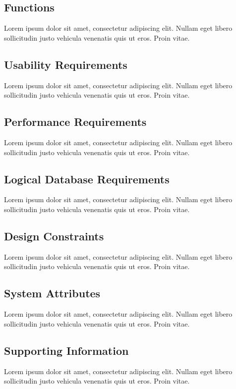 \documentclass[a4paper]{article}
\begin{document}
        \subsection{Functions}

        Lorem ipsum dolor sit amet, consectetur adipiscing elit. Nullam eget libero sollicitudin justo vehicula venenatis quis ut eros. Proin vitae.

        \subsection{Usability Requirements}

        Lorem ipsum dolor sit amet, consectetur adipiscing elit. Nullam eget libero sollicitudin justo vehicula venenatis quis ut eros. Proin vitae.

        \subsection{Performance Requirements}

        Lorem ipsum dolor sit amet, consectetur adipiscing elit. Nullam eget libero sollicitudin justo vehicula venenatis quis ut eros. Proin vitae.

        \subsection{Logical Database Requirements}

        Lorem ipsum dolor sit amet, consectetur adipiscing elit. Nullam eget libero sollicitudin justo vehicula venenatis quis ut eros. Proin vitae.

        \subsection{Design Constraints}

        Lorem ipsum dolor sit amet, consectetur adipiscing elit. Nullam eget libero sollicitudin justo vehicula venenatis quis ut eros. Proin vitae.

        \subsection{System Attributes}

        Lorem ipsum dolor sit amet, consectetur adipiscing elit. Nullam eget libero sollicitudin justo vehicula venenatis quis ut eros. Proin vitae.

        \subsection{Supporting Information}

        Lorem ipsum dolor sit amet, consectetur adipiscing elit. Nullam eget libero sollicitudin justo vehicula venenatis quis ut eros. Proin vitae.
\end{document}
